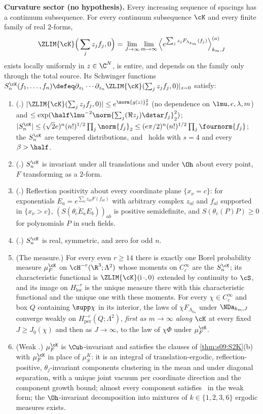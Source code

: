 \begin{theorem}
\textbf{Curvature sector (no hypothesis).} Every increasing sequence of spacings has a continuum subsequence. For every continuum subsequence $\cK$ and every finite family of real $2$-forms,
\[
\ZLIM{\cK}\Big(\sum_jz_jf_j,0\Big)=\lim_{J\to\infty}\lim_{m\to\infty}\Big\langle e^{\sum_jz_jF_{\Lambda_{k_m}}(f_j)}\Big\rangle^{(a)}_{k_m,J}
\]
exists locally uniformly in $z\in\C^N$, is entire, and depends on the family only through the total source. Its Schwinger functions $S^{\cK}_n(f_1,\dots,f_n)\defeq\partial_{z_1}\cdots\partial_{z_n}\ZLIM{\cK}(\sum_jz_jf_j,0)|_{z=0}$ satisfy:
\begin{enumerate}[label=\textup{(\roman*)},leftmargin=*,nosep]
\item \textup{(\OSz.)} $|\ZLIM{\cK}(\sum_jz_jf_j,0)|\le e^{\norm{g(z)}_2^2}$ (no dependence on $\lmu,e,\lambda,m$) and $\le\exp(\half\lmu^{-2}\norm{\sum_j(\Re z_j)\dstar f_j}_2^2)$; $|S^{\cK}_n|\le(\sqrt2e)^n(n!)^{1/2}\prod_j\norm{f_j}_2\le(e\pi/2)^n(n!)^{1/2}\prod_j\fournorm{f_j}$; the $S^{\cK}_n$ are tempered distributions, and \Ezz\ holds with $s=4$ and every $\beta>\half$.
\item \textup{(\OSo.)} $S^{\cK}_n$ is invariant under all translations and under $\Oh$ about every point, $F$ transforming as a $2$-form.
\item \textup{(\OSt.)} Reflection positivity about every coordinate plane $\{x_\nu=c\}$: for exponentials $E_a=e^{\sum_lz_{al}F(f_{al})}$ with arbitrary complex $z_{al}$ and $f_{al}$ supported in $\{x_\nu>c\}$, $(S(\overline{\theta_cE_a}E_b))_{ab}$ is positive semidefinite, and $S(\theta_c(P)P)\ge0$ for polynomials $P$ in such fields.
\item \textup{(\OSth.)} $S^{\cK}_n$ is real, symmetric, and zero for odd $n$.
\item \textup{(The measure.)} For every even $r\ge14$ there is exactly one Borel probability measure $\mu^{\cK}_F$ on $\cH^{-r}(\R^3;\Lambda^2)$ whose moments on $C^\infty_c$ are the $S^{\cK}_n$; its characteristic functional is $\ZLIM{\cK}(\mathrm i\,\cdot,0)$ extended by continuity to $\cS$, and its image on $H^{-r}_{\mathrm{loc}}$ is the unique measure there with this characteristic functional and the unique one with these moments. For every $\chi\in C^\infty_c$ and box $Q$ containing $\supp\chi$ in its interior, the laws of $\chi F_{\Lambda_{k_m}}$ under $\NDa_{k_m,J}$ converge weakly on $H^{-r}_{\mathrm{per}}(Q;\Lambda^2)$, \emph{first as $m\to\infty$ along $\cK$} at every fixed $J\ge J_0(\chi)$ and then as $J\to\infty$, to the law of $\chi\Phi$ under $\mu^{\cK}_F$.
\item \textup{(Weak \OSf.)} $\mu^{\cK}_F$ is $\Cub$-invariant and satisfies the clauses of \cref{thm:s09:S2K}(b) with $\mu^{\cK}_F$ in place of $\mu^K_S$: it is an integral of translation-ergodic, reflection-positive, $\theta_j$-invariant components clustering in the mean and under diagonal separation, with a unique joint vacuum per coordinate direction and the component growth bound; almost every component satisfies \OSf\ in the weak form; the $\Oh$-invariant decomposition into mixtures of $k\in\{1,2,3,6\}$ ergodic measures exists.

\end{enumerate}
\end{theorem}
